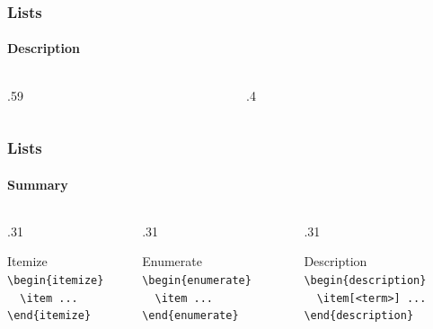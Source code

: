 \begin{frame}
    \frametitle{Lists}
    \framesubtitle{Description}
    \begin{columns}
        \begin{column}{.59\textwidth}
        \end{column}
        \begin{column}{.4\textwidth}
                        
        \end{column}
    \end{columns}
\end{frame}

\begin{frame}[fragile]
    \frametitle{Lists}
    \framesubtitle{Summary}
    \begin{columns}
        \begin{column}{.31\textwidth}
            \begin{block}{\blockstrut Itemize}
                \lstinline|\begin{itemize}|\\
                \lstinline|  \item ...|\\
                \lstinline|\end{itemize}|
            \end{block}
        \end{column}
        \begin{column}{.31\textwidth}
            \begin{block}{\blockstrut Enumerate}
                \lstinline|\begin{enumerate}|\\
                \lstinline|  \item ...|\\
                \lstinline|\end{enumerate}|
            \end{block}
        \end{column}
        \begin{column}{.31\textwidth}
            \begin{block}{\blockstrut Description}
                \lstinline|\begin{description}|\\
                \lstinline|  \item[<term>] ...|\\
                \lstinline|\end{description}|
            \end{block}
        \end{column}
    \end{columns}
\end{frame}